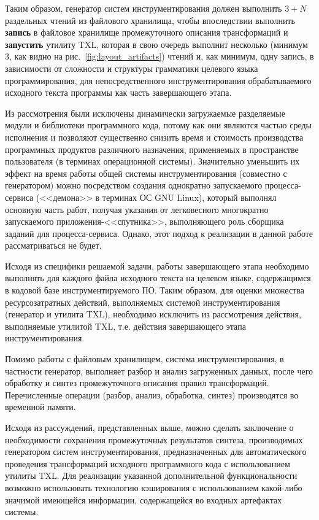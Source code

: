 Таким образом, генератор систем инструментирования должен выполнить $3 + N$ раздельных чтений из файлового хранилища, чтобы впоследствии выполнить \textbf{запись} в файловое хранилище промежуточного описания трансформаций и \textbf{запустить} утилиту TXL, которая в свою очередь выполнит несколько (минимум $3$, как видно на рис.~\ref{fig:layout_artifacts}) чтений и, как минимум, одну запись, в зависимости от сложности и структуры грамматики целевого языка программирования, для непосредственного инструментирования обрабатываемого исходного текста программы как часть завершающего этапа.

Из рассмотрения были исключены динамически загружаемые разделяемые модули и библиотеки программного кода, потому как они являются частью среды исполнения и позволяют существенно снизить время и стоимость производства программных продуктов различного назначения, применяемых в пространстве пользователя (в терминах операционной системы).
Значительно уменьшить их эффект на время работы общей системы инструментирования (совместно с генератором) можно посредством создания однократно запускаемого процесса-сервиса (<<демона>> в терминах ОС GNU Linux), который выполнял основную часть работ, получая указания от легковесного многократно запускаемого приложения-<<спутника>>, выполняющего роль сборщика заданий для процесса-сервиса.
Однако, этот подход к реализации в данной работе рассматриваться не будет.


Исходя из специфики решаемой задачи, работы завершающего этапа необходимо выполнять для каждого файла исходного текста на целевом языке, содержащимся в кодовой базе инструментируемого ПО.
Таким образом, для оценки множества ресурсозатратных действий, выполняемых системой инструментирования (генератор и утилита TXL), необходимо исключить из рассмотрения действия, выполняемые утилитой TXL, т.е. действия завершающего этапа инструментирования.

Помимо работы с файловым хранилищем, система инструментирования, в частности генератор, выполняет разбор и анализ загруженных данных, после чего обработку и синтез промежуточного описания правил трансформаций.
Перечисленные операции (разбор, анализ, обработка, синтез) производятся во временной памяти.

Исходя из рассуждений, представленных выше, можно сделать заключение о необходимости сохранения промежуточных результатов синтеза, производимых генератором систем инструментирования, предназначенных для автоматического проведения трансформаций исходного программного кода с использованием утилиты TXL.
Для реализации указанной дополнительной функциональности возможно использовать технологию кэширования с использованием какой-либо значимой имеющейся информации, содержащейся во входных артефактах системы.

